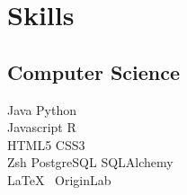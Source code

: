 \documentclass[]{junhu_resume}
\begin{document}
\begin{minipage}[t]{0.33\textwidth}

\section{Skills}
\subsection{Computer Science}
Java \textbullet{} Python\\
Javascript \textbullet{} R\\
HTML5 \textbullet{} CSS3\\
Zsh
PostgreSQL \textbullet{} SQLAlchemy\\
\LaTeX\ \textbullet{} OriginLab\\
\sectionsep

%
%

\end{minipage} 
\hfill
\end{document}

